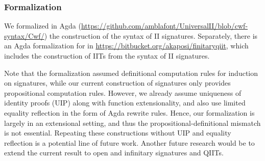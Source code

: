 \subsubsection*{Formalization}
We formalized in Agda
(\url{https://github.com/amblafont/UniversalII/blob/cwf-syntax/Cwf/}) the
construction of the syntax of II signatures. Separately, there is an Agda
formalization for \cite{qiit} in
\url{https://bitbucket.org/akaposi/finitaryqiit}, which includes the
construction of IITs from the syntax of II signatures.

Note that the \cite{qiit} formalization assumed definitional computation rules
for induction on signatures, while our current construction of signatures only
provides propositional computation rules. However, we already assume uniqueness
of identity proofs (UIP) along with function extensionality, and also use limited
equality reflection in the form of Agda rewrite rules. Hence, our formalization
is largely in an extensional setting, and thus the propositional-definitional
mismatch is not essential. Repeating these constructions without UIP and equality
reflection is a potential line of future work. Another future research would be to
extend the current result to open and infinitary signatures and QIITs.
